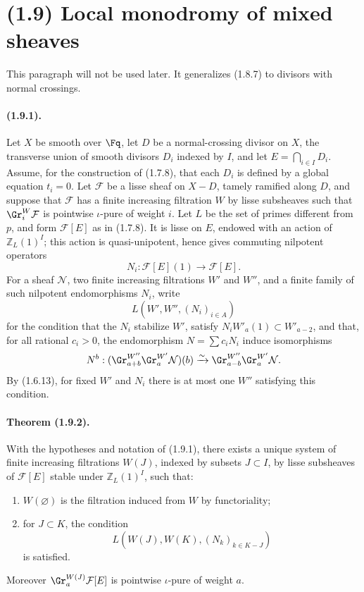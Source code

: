 
\section*{(1.9) Local monodromy of mixed sheaves}

This paragraph will not be used later. It generalizes (1.8.7) to divisors with normal crossings.

\paragraph{(1.9.1).}
Let $X$ be smooth over $\Fq$, let $D$ be a normal-crossing divisor on $X$, the transverse union of smooth divisors $D_i$ indexed by $I$, and let $E=\bigcap_{i\in I}D_i$. Assume, for the construction of (1.7.8), that each $D_i$ is defined by a global equation $t_i=0$. Let $\mathcal F$ be a lisse sheaf on $X-D$, tamely ramified along $D$, and suppose that $\mathcal F$ has a finite increasing filtration $W$ by lisse subsheaves such that $\Gr^W_i\mathcal F$ is pointwise $\iota$-pure of weight $i$. Let $L$ be the set of primes different from $p$, and form $\mathcal F[E]$ as in (1.7.8). It is lisse on $E$, endowed with an action of $\mathbb Z_L(1)^I$; this action is quasi-unipotent, hence gives commuting nilpotent operators
\[
  N_i:\mathcal F[E](1)\longrightarrow \mathcal F[E].
\]
For a sheaf $\mathcal N$, two finite increasing filtrations $W'$ and $W''$, and a finite family of such nilpotent endomorphisms $N_i$, write
\[
  L(W',W'',(N_i)_{i\in A})
\]
for the condition that the $N_i$ stabilize $W'$, satisfy $N_iW'_a(1)\subset W'_{a-2}$, and that, for all rational $c_i>0$, the endomorphism $N=\sum c_iN_i$ induce isomorphisms
\[
  N^b:(\Gr^{W''}_{a+b}\Gr^{W'}_a\mathcal N)(b)
  \xrightarrow{\sim}\Gr^{W''}_{a-b}\Gr^{W'}_a\mathcal N.
\]
By (1.6.13), for fixed $W'$ and $N_i$ there is at most one $W''$ satisfying this condition.

\paragraph{Theorem (1.9.2).}
With the hypotheses and notation of (1.9.1), there exists a unique system of finite increasing filtrations $W(J)$, indexed by subsets $J\subset I$, by lisse subsheaves of $\mathcal F[E]$ stable under $\mathbb Z_L(1)^I$, such that:
\begin{enumerate}[label=\alph*)]
\item $W(\varnothing)$ is the filtration induced from $W$ by functoriality;
\item for $J\subset K$, the condition
\[
  L(W(J),W(K),(N_k)_{k\in K-J})
\]
is satisfied.
\end{enumerate}
Moreover $\Gr^{W(J)}_a\mathcal F[E]$ is pointwise $\iota$-pure of weight $a$.


